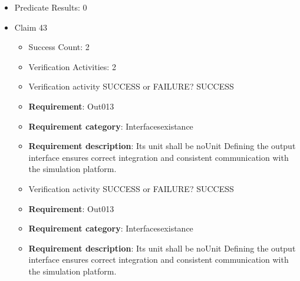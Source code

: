 \documentclass{article}
\begin{document}
\begin{itemize}
\begin{itemize}
						\item \textbf{Requirement}: Out012 
						\item \textbf{Requirement category}: Interfacesexistance 
						\item \textbf{Requirement description}: Its unit shall be rad Defining the output interface ensures correct integration and consistent communication with the simulation platform.
					
					\item Verification activity SUCCESS or FAILURE? SUCCESS
		
						\item \textbf{Requirement}: Out012 
						\item \textbf{Requirement category}: Interfacesexistance 
						\item \textbf{Requirement description}: Its unit shall be rad Defining the output interface ensures correct integration and consistent communication with the simulation platform.
					
				\end{itemize}
				
									    
				\item Predicate Results: 0

  				  \item Claim 43
				\begin{itemize}
			    	\item Success Count: 2 
			    	\item Verification Activities: 2
					\item Verification activity SUCCESS or FAILURE? SUCCESS
		
						\item \textbf{Requirement}: Out013 
						\item \textbf{Requirement category}: Interfacesexistance 
						\item \textbf{Requirement description}: Its unit shall be noUnit Defining the output interface ensures correct integration and consistent communication with the simulation platform.
					
					\item Verification activity SUCCESS or FAILURE? SUCCESS
		
						\item \textbf{Requirement}: Out013 
						\item \textbf{Requirement category}: Interfacesexistance 
						\item \textbf{Requirement description}: Its unit shall be noUnit Defining the output interface ensures correct integration and consistent communication with the simulation platform.
					

\end{itemize}
\end{itemize}
\end{document}
